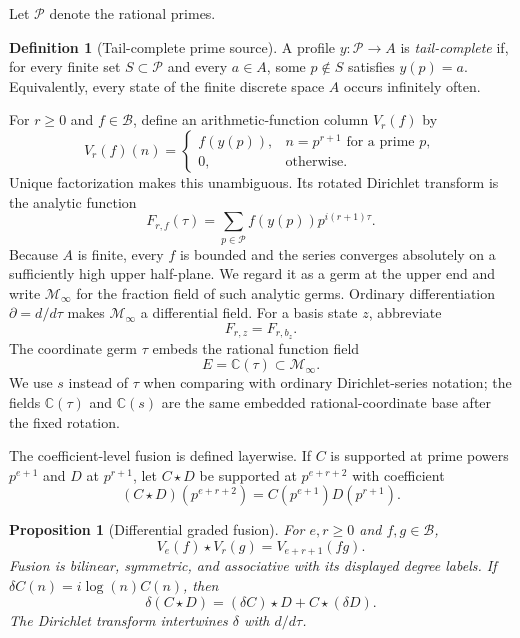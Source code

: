 \documentclass[11pt]{article}
\newtheorem{proposition}[theorem]{Proposition}
\theoremstyle{definition}
\newtheorem{definition}[theorem]{Definition}
\theoremstyle{remark}
\newcommand{\C}{\mathbb C}
\newcommand{\cB}{\mathcal B}
\newcommand{\cM}{\mathcal M}
\newcommand{\cP}{\mathcal P}
\newcommand{\diff}{\partial}
\begin{document}
Let \(\cP\) denote the rational primes.

\begin{definition}[Tail-complete prime source]\label{def:tail-complete}
A profile \(y:\cP\to A\) is \emph{tail-complete} if, for every finite set
\(S\subset\cP\) and every \(a\in A\), some \(p\notin S\) satisfies \(y(p)=a\).
Equivalently, every state of the finite discrete space \(A\) occurs infinitely often.
\end{definition}

For \(r\geq0\) and \(f\in\cB\), define an arithmetic-function column \(V_r(f)\) by
\begin{equation}\label{eq:valuation-lift}
 V_r(f)(n)=
 \begin{cases}
 f(y(p)),&n=p^{r+1}\text{ for a prime }p,\\
 0,&\text{otherwise}.
 \end{cases}
\end{equation}
Unique factorization makes this unambiguous.  Its rotated Dirichlet transform is the analytic
function
\begin{equation}\label{eq:analytic-carrier}
 F_{r,f}(\tau)=\sum_{p\in\cP}f(y(p))p^{i(r+1)\tau}.
\end{equation}
Because \(A\) is finite, every \(f\) is bounded and the series converges absolutely on a
sufficiently high upper half-plane.  We regard it as a germ at the upper end and write
\(\cM_\infty\) for the fraction field of such analytic germs.  Ordinary differentiation
\(\diff=d/d\tau\) makes \(\cM_\infty\) a differential field.  For a basis state \(z\), abbreviate
\[
 F_{r,z}=F_{r,b_z}.
\]
The coordinate germ \(\tau\) embeds the rational function field
\begin{equation}\label{eq:coordinate-field}
 E=\C(\tau)\subset\cM_\infty.
\end{equation}
We use \(s\) instead of \(\tau\) when comparing with ordinary Dirichlet-series notation; the
fields \(\C(\tau)\) and \(\C(s)\) are the same embedded rational-coordinate base after the fixed
rotation.

The coefficient-level fusion is defined layerwise.  If \(C\) is supported at prime powers
\(p^{e+1}\) and \(D\) at \(p^{r+1}\), let \(C\star D\) be supported at
\(p^{e+r+2}\) with coefficient
\begin{equation}\label{eq:fusion-definition}
 (C\star D)(p^{e+r+2})=C(p^{e+1})D(p^{r+1}).
\end{equation}

\begin{proposition}[Differential graded fusion]\label{prop:fusion}
For \(e,r\geq0\) and \(f,g\in\cB\),
\begin{equation}\label{eq:fusion-source}
 V_e(f)\star V_r(g)=V_{e+r+1}(fg).
\end{equation}
Fusion is bilinear, symmetric, and associative with its displayed degree labels.  If
\(\delta C(n)=i\log(n)C(n)\), then
\begin{equation}\label{eq:fusion-leibniz}
 \delta(C\star D)=(\delta C)\star D+C\star(\delta D).
\end{equation}
The Dirichlet transform intertwines \(\delta\) with \(d/d\tau\).
\end{proposition}
\end{document}
